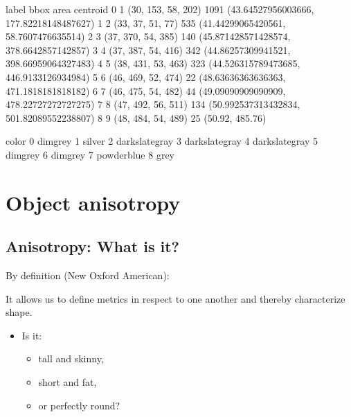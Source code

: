\documentclass[letterpaper,10pt,english]{sphinxmanual}
\begin{document}
\begin{sphinxVerbatim}[commandchars=\\\{\}]
   label                bbox  area                                  centroid  \PYGZbs{}
0      1  (30, 153, 58, 202)  1091   (43.64527956003666, 177.82218148487627)   
1      2    (33, 37, 51, 77)   535     (41.44299065420561, 58.7607476635514)   
2      3  (37, 370, 54, 385)   140   (45.871428571428574, 378.6642857142857)   
3      4  (37, 387, 54, 416)   342   (44.86257309941521, 398.66959064327483)   
4      5  (38, 431, 53, 463)   323   (44.526315789473685, 446.9133126934984)   
5      6  (46, 469, 52, 474)    22    (48.63636363636363, 471.1818181818182)   
6      7  (46, 475, 54, 482)    44   (49.09090909090909, 478.22727272727275)   
7      8  (47, 492, 56, 511)   134  (50.992537313432834, 501.82089552238807)   
8      9  (48, 484, 54, 489)    25                           (50.92, 485.76)   

           color  
0        dimgrey  
1         silver  
2  darkslategray  
3  darkslategray  
4  darkslategray  
5        dimgrey  
6        dimgrey  
7     powderblue  
8           grey  
\end{sphinxVerbatim}

\noindent{}


\chapter{Object anisotropy}
\label{\detokenize{06-ShapeAnalysis:object-anisotropy}}

\section{Anisotropy: What is it?}
\label{\detokenize{06-ShapeAnalysis:anisotropy-what-is-it}}
\sphinxAtStartPar
By definition (New Oxford American): 

It allows us to define metrics in respect to one another and thereby characterize shape.
\begin{itemize}
\item {} 
\sphinxAtStartPar
Is it:
\begin{itemize}
\item {} 
\sphinxAtStartPar
tall and skinny,

\item {} 
\sphinxAtStartPar
short and fat,

\item {} 
\sphinxAtStartPar
or perfectly round?

\end{itemize}

\end{itemize}
\end{document}
